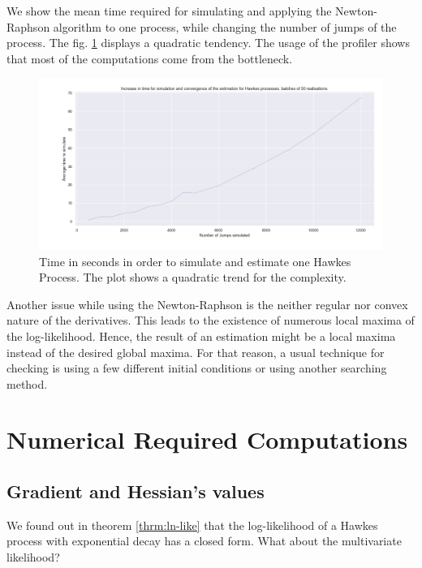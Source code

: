We show the mean time required for simulating and applying the Newton-Raphson algorithm to one process, while changing the number of jumps of the process. The fig. \ref{fig:complex} displays a quadratic tendency. The usage of the profiler shows that most of the computations come from the bottleneck.  

\begin{figure}
\centering
\includegraphics[width = 0.90 \textwidth]{../imag/chap2/complexity.png}
\caption{Time in seconds in order to simulate and estimate one Hawkes Process. The plot shows a quadratic trend for the complexity.}
\label{fig:complex}
\end{figure}

Another issue while using the Newton-Raphson is the neither regular nor convex nature of the derivatives. This leads to the existence of numerous local maxima of the log-likelihood. Hence, the result of an estimation might be a local maxima instead of the desired global maxima. For that reason, a usual technique for checking is using a few different initial conditions or using another searching method.















\section{Numerical Required Computations}
\subsection{Gradient and Hessian's values}
\label{subsection_R_def}

We found out in theorem \ref{thrm:ln-like} that the log-likelihood of a Hawkes process with exponential decay has a closed form. What about the multivariate likelihood?

